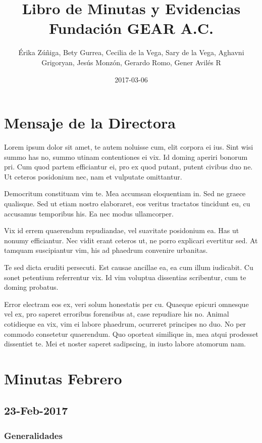 \documentclass[]{book}
\title{Libro de Minutas y Evidencias Fundación GEAR A.C.}
\author{Érika Zúñiga, Bety Gurrea, Cecilia de la Vega, Sary de la Vega, Aghavni
Grigoryan, Jesús Monzón, Gerardo Romo, Gener Avilés R}
\date{2017-03-06}
\begin{document}
\maketitle

{
\setcounter{tocdepth}{1}
\tableofcontents
}
\chapter{Mensaje de la Directora}\label{mensaje-de-la-directora}

Lorem ipsum dolor sit amet, te autem noluisse cum, elit corpora ei ius.
Sint wisi summo has no, summo utinam contentiones ei vix. Id doming
aperiri bonorum pri. Cum quod partem efficiantur ei, pro ex quod putant,
putent civibus duo ne. Ut ceteros posidonium nec, nam et vulputate
omittantur.

Democritum constituam vim te. Mea accumsan eloquentiam in. Sed ne graece
qualisque. Sed ut etiam nostro elaboraret, eos veritus tractatos
tincidunt eu, cu accusamus temporibus his. Ea nec modus ullamcorper.

Vix id errem quaerendum repudiandae, vel suavitate posidonium ea. Has ut
nonumy efficiantur. Nec vidit erant ceteros ut, ne porro explicari
evertitur sed. At tamquam suscipiantur vim, his ad phaedrum convenire
urbanitas.

Te sed dicta eruditi persecuti. Est causae ancillae ea, ea cum illum
iudicabit. Cu sonet petentium referrentur vix. Id vim voluptua
dissentias scribentur, cum te doming probatus.

Error electram eos ex, veri solum honestatis per cu. Quaeque epicuri
omnesque vel ex, pro saperet erroribus forensibus at, case repudiare his
no. Animal cotidieque ea vix, vim ei labore phaedrum, ocurreret
principes no duo. No per commodo consetetur quaerendum. Quo oporteat
similique in, mea atqui prodesset dissentiet te. Mei et noster saperet
sadipscing, in iusto labore atomorum nam.

\chapter{Minutas Febrero}\label{intro}

\section{23-Feb-2017}\label{feb-2017}

\subsection{Generalidades}\label{generalidades}
\end{document}
